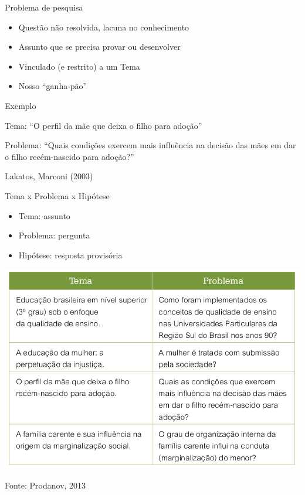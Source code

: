 \documentclass{beamer}
\begin{document}
\begin{frame}{Problema de pesquisa}
  \begin{itemize}
  \item Questão não resolvida, lacuna no conhecimento
  \item Assunto que se precisa provar ou desenvolver
  \item Vinculado (e restrito) a um Tema
  \item Nosso ``ganha-pão''
  \end{itemize}
\end{frame}

\begin{frame}{Exemplo}
  \begin{example}
    Tema: ``O perfil da mãe que deixa o filho para adoção''

    \bigskip

    Problema: ``Quais condições exercem mais influência na decisão das
    mães em dar o filho recém-nascido para adoção?''
  \end{example}
  Lakatos, Marconi (2003)
\end{frame}

\begin{frame}{Tema x Problema x Hipótese}
  \begin{itemize}
  \item Tema: assunto
  \item Problema: pergunta
  \item Hipótese: resposta provisória
  \end{itemize}
\end{frame}

\begin{frame}
  \includegraphics[height=0.8\textheight]{Hipoteses_variaveis/tema_problema}

  Fonte: Prodanov, 2013
\end{frame}
\end{document}
